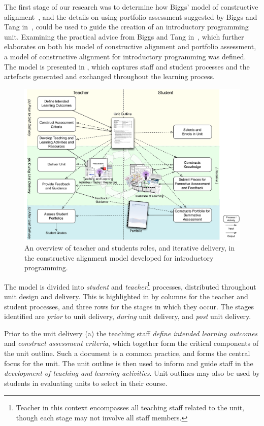 The first stage of our research was to determine how Biggs' model of constructive alignment~\cite{Biggs:1996c}, and the details on using portfolio assessment suggested by Biggs and Tang in~\cite{Biggs:1997}, could be used to guide the creation of an introductory programming unit. Examining the practical advice from Biggs and Tang in~\cite{Biggs:2007}, which further elaborates on both his model of constructive alignment and portfolio assessment, a model of constructive alignment for introductory programming was defined. The model is presented in , which captures staff and student processes and the artefacts generated and exchanged throughout the learning process.

\begin{figure}[t!]
	\centering
	\includegraphics[width=6in]{ProcessOverview}
	\caption{An overview of teacher and students roles, and iterative delivery, in the constructive alignment model developed for introductory programming.}
	\label{fig:process_overview}
\end{figure}

The model is divided into \emph{student} and \emph{teacher}\footnote{Teacher in this context encompasses all teaching staff related to the unit, though each stage may not involve all staff members.} processes, distributed throughout unit design and delivery. This is highlighted in  by columns for the teacher and student processes, and three rows for the stages in which they occur. The stages identified are \emph{prior} to unit delivery, \emph{during} unit delivery, and \emph{post} unit delivery.

Prior to the unit delivery (a) the teaching staff \emph{define intended learning outcomes} and \emph{construct assessment criteria}, which together form the critical components of the unit outline. Such a document is a common practice, and forms the central focus for the unit. The unit outline is then used to inform and guide staff in the \emph{development of teaching and learning activities}. Unit outlines may also be used by students in evaluating units to select in their course.

